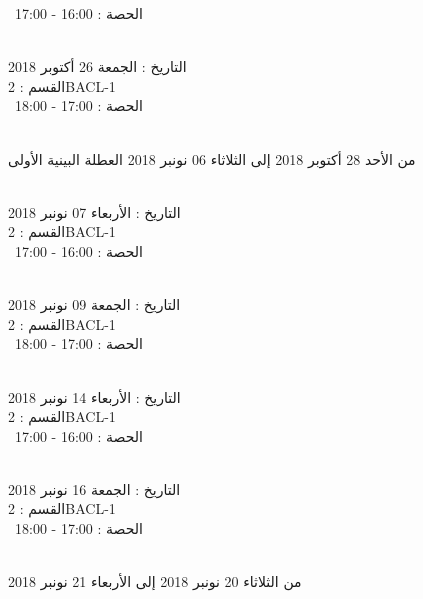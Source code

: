 \documentclass[14pt a4paper twocolumn]{book}
\begin{document}
 \  
الحصة : 16:00 - 17:00 \\
\par
\noindent\makebox[\linewidth]{\rule{\paperwidth}{0.4pt}}
 \\
التاريخ : الجمعة 26 أكتوبر 2018 \\
القسم : 2BACL-1 \\
 \  
الحصة : 17:00 - 18:00 \\
\par
\noindent\makebox[\linewidth]{\rule{\paperwidth}{0.4pt}}
 \\
من الأحد 28 أكتوبر 2018 إلى الثلاثاء 06 نونبر 2018
\newline
\indent
 العطلة البينية الأولى
\par
\noindent\makebox[\linewidth]{\rule{\paperwidth}{0.4pt}}
 \\
التاريخ : الأربعاء 07 نونبر 2018 \\
القسم : 2BACL-1 \\
 \  
الحصة : 16:00 - 17:00 \\
\par
\noindent\makebox[\linewidth]{\rule{\paperwidth}{0.4pt}}
 \\
التاريخ : الجمعة 09 نونبر 2018 \\
القسم : 2BACL-1 \\
 \  
الحصة : 17:00 - 18:00 \\
\par
\noindent\makebox[\linewidth]{\rule{\paperwidth}{0.4pt}}
 \\
التاريخ : الأربعاء 14 نونبر 2018 \\
القسم : 2BACL-1 \\
 \  
الحصة : 16:00 - 17:00 \\
\par
\noindent\makebox[\linewidth]{\rule{\paperwidth}{0.4pt}}
 \\
التاريخ : الجمعة 16 نونبر 2018 \\
القسم : 2BACL-1 \\
 \  
الحصة : 17:00 - 18:00 \\
\par
\noindent\makebox[\linewidth]{\rule{\paperwidth}{0.4pt}}
 \\
من الثلاثاء 20 نونبر 2018 إلى الأربعاء 21 نونبر 2018
\newline
\end{document}

